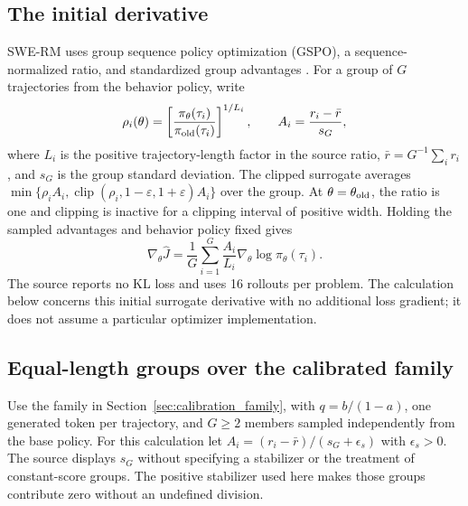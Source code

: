 \documentclass[11pt]{article}
\begin{document}
\subsection{The initial derivative}
SWE-RM uses group sequence policy optimization (GSPO), a sequence-normalized ratio, and standardized group advantages \citep[Appendix E.1, Eqs.~14--15, PDF pp.~20--21]{Shum2026SWE_RM}. For a group of $G$ trajectories from the behavior policy, write
\begin{equation}
\rho_i(\theta)=
\left[\frac{\pi_\theta(\tau_i)}{\pi_{\rm old}(\tau_i)}\right]^{1/L_i},
\qquad
A_i=\frac{r_i-\bar r}{s_G},
\label{eq:gsporatio}
\end{equation}
where $L_i$ is the positive trajectory-length factor in the source ratio,
$\bar r=G^{-1}\sum_i r_i$, and $s_G$ is the group standard deviation. The clipped surrogate averages
$\min\{\rho_i A_i,\operatorname{clip}(\rho_i,1-\varepsilon,1+\varepsilon)A_i\}$ over the group. At $\theta=\theta_{\rm old}$, the ratio is one and clipping is inactive for a clipping interval of positive width. Holding the sampled advantages and behavior policy fixed gives
\begin{equation}
\nabla_\theta\widehat J
=\frac1G\sum_{i=1}^G\frac{A_i}{L_i}
\nabla_\theta\log\pi_\theta(\tau_i).
\label{eq:gspoinitial}
\end{equation}
The source reports no KL loss and uses 16 rollouts per problem. The calculation below concerns this initial surrogate derivative with no additional loss gradient; it does not assume a particular optimizer implementation.

\subsection{Equal-length groups over the calibrated family}
\label{sec:family_gspo}
Use the family in Section~\ref{sec:calibration_family}, with $q=b/(1-a)$, one generated token per trajectory, and $G\geq2$ members sampled independently from the base policy. For this calculation let
$A_i=(r_i-\bar r)/(s_G+\epsilon_s)$ with $\epsilon_s>0$.
The source displays $s_G$ without specifying a stabilizer or the treatment of constant-score groups. The positive stabilizer used here makes those groups contribute zero without an undefined division.
\end{document}
